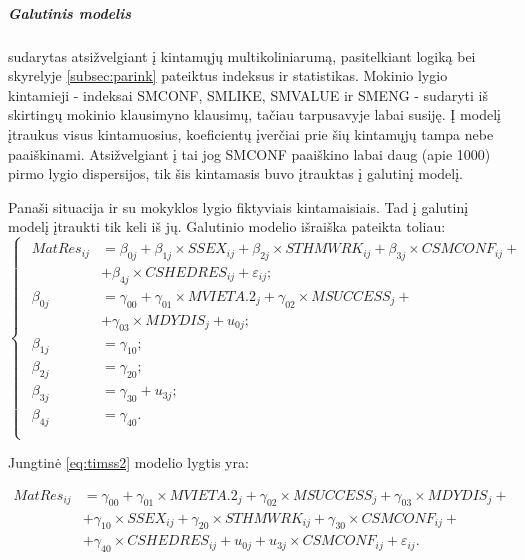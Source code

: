 \documentclass[11pt,a4paper]{article}
\begin{document}
\subparagraph{Galutinis modelis} sudarytas atsižvelgiant į kintamųjų multikoliniarumą, pasitelkiant logiką bei skyrelyje \ref{subsec:parink} pateiktus indeksus ir statistikas. Mokinio lygio kintamieji - indeksai SMCONF, SMLIKE, SMVALUE ir SMENG - sudaryti iš skirtingų mokinio klausimyno klausimų, tačiau tarpusavyje labai susiję. Į modelį įtraukus visus kintamuosius, koeficientų įverčiai prie šių kintamųjų tampa nebe paaiškinami. Atsižvelgiant į tai jog SMCONF paaiškino labai daug (apie 1000) pirmo lygio dispersijos, tik šis kintamasis buvo įtrauktas į galutinį modelį.

\indent Panaši situacija ir su mokyklos lygio fiktyviais kintamaisiais. Tad į galutinį modelį įtraukti tik keli iš jų. Galutinio modelio išraiška pateikta toliau:
\begin{equation} \label{eq:timss2}
\left\{
\begin{array}{l}
\begin{split}
MatRes_{ij}&=\beta_{0j}+\beta_{1j}\times SSEX_{ij}+\beta_{2j} \times STHMWRK_{ij}+\beta_{3j}\times CSMCONF_{ij}+\\
&+\beta_{4j}\times CSHEDRES_{ij}+\varepsilon_{ij};\\
\beta_{0j}&=\gamma_{00}+\gamma_{01}\times MVIETA.2_j+\gamma_{02}\times MSUCCESS_j+\\
&+\gamma_{03}\times MDYDIS_j+u_{0j};\\
\beta_{1j}& = \gamma_{10};\\
\beta_{2j}&=\gamma_{20};\\
\beta_{3j}&=\gamma_{30}+u_{3j};\\
\beta_{4j}&=\gamma_{40}.\\
\end{split}
\end{array} \right.
\end{equation}

Jungtinė \ref{eq:timss2} modelio lygtis yra:

\begin{equation} \label{eq:timss3}
\begin{split}
MatRes_{ij}&=\gamma_{00}+\gamma_{01}\times MVIETA.2_j+\gamma_{02}\times MSUCCESS_j+\gamma_{03}\times MDYDIS_j+\\
&+ \gamma_{10}\times SSEX_{ij}+\gamma_{20} \times STHMWRK_{ij}+\gamma_{30}\times CSMCONF_{ij}+\\
&+ \gamma_{40}\times CSHEDRES_{ij}+u_{0j}+u_{3j}\times  CSMCONF_{ij} +\varepsilon_{ij}.
\end{split}
\end{equation}
\end{document}
